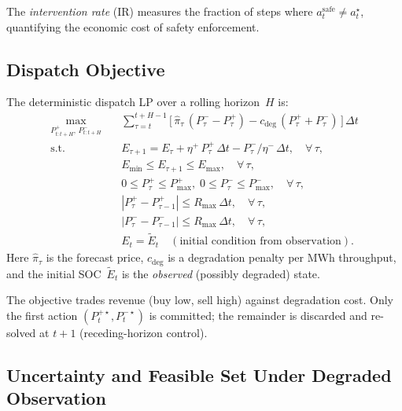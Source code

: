 The \emph{intervention rate} (IR) measures the fraction of steps where
$a_t^{\mathrm{safe}} \neq a_t^\star$, quantifying the economic cost of
safety enforcement.

\subsection{Dispatch Objective}
\label{sec:dispatch-objective}

The deterministic dispatch LP over a rolling horizon~$H$ is:
\begin{equation}
\label{eq:dispatch-lp}
\begin{aligned}
  \max_{P_{t:t+H}^{+},\, P_{t:t+H}^{-}} \quad &
    \sum_{\tau=t}^{t+H-1}
    \bigl[\,\hat{\pi}_\tau\,(P_\tau^{-} - P_\tau^{+})
           - c_{\mathrm{deg}}\,(P_\tau^{+} + P_\tau^{-})\,\bigr]\,\Delta t \\
  \text{s.t.} \quad &
    E_{\tau+1} = E_\tau + \eta^{+}\,P_\tau^{+}\,\Delta t
                       - P_\tau^{-}/\eta^{-}\,\Delta t,
      \quad \forall\,\tau, \\
  & E_{\min} \le E_{\tau+1} \le E_{\max},
      \quad \forall\,\tau, \\
  & 0 \le P_\tau^{+} \le P_{\max}^{+},\;
    0 \le P_\tau^{-} \le P_{\max}^{-},
      \quad \forall\,\tau, \\
  & |P_\tau^{+} - P_{\tau-1}^{+}| \le R_{\max}\,\Delta t,
      \quad \forall\,\tau, \\
  & |P_\tau^{-} - P_{\tau-1}^{-}| \le R_{\max}\,\Delta t,
      \quad \forall\,\tau, \\
  & E_t = \tilde{E}_t \quad (\text{initial condition from observation}).
\end{aligned}
\end{equation}
Here $\hat{\pi}_\tau$ is the forecast price, $c_{\mathrm{deg}}$ is a
degradation penalty per MWh throughput, and the initial SOC~$\tilde{E}_t$ is
the \emph{observed} (possibly degraded) state.

The objective trades revenue (buy low, sell high) against degradation cost.
Only the first action $(P_t^{+\star}, P_t^{-\star})$ is committed; the
remainder is discarded and re-solved at $t+1$ (receding-horizon control).

\subsection{Uncertainty and Feasible Set Under Degraded Observation}

